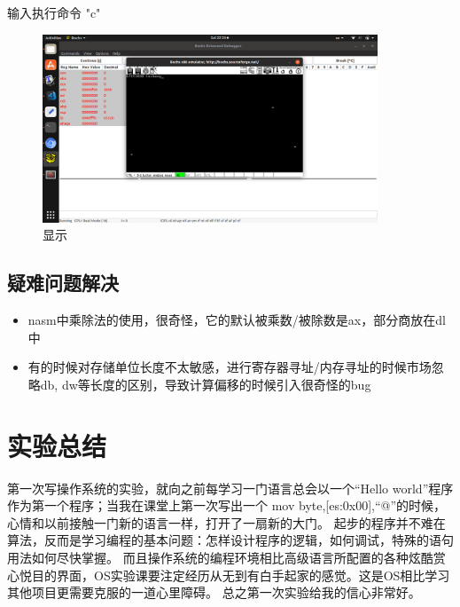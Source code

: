 \documentclass[a4paper,11pt,UTF8]{ctexart}
\newcommand{\bottomcaption}{%
\setlength{\abovecaptionskip}{6pt}%
\setlength{\belowcaptionskip}{6pt}%
\caption}
\begin{document}
	输入执行命令 "c"

	\begin{figure}[htbp]
		\centering
		\includegraphics[width=10cm]{Screenshot from 2019-03-23 22-23-44.png}
		\bottomcaption{显示}
	\end{figure}


\subsection{疑难问题解决}
	
	\begin{itemize}
		\item nasm中乘除法的使用，很奇怪，它的默认被乘数/被除数是ax，部分商放在dl中
		
		\item 有的时候对存储单位长度不太敏感，进行寄存器寻址/内存寻址的时候市场忽略db, dw等长度的区别，导致计算偏移的时候引入很奇怪的bug
			
	\end{itemize}


\section{实验总结}

第一次写操作系统的实验，就向之前每学习一门语言总会以一个“Hello world”程序作为第一个程序；当我在课堂上第一次写出一个
mov byte,[es:0x00],“@”的时候，心情和以前接触一门新的语言一样，打开了一扇新的大门。
起步的程序并不难在算法，反而是学习编程的基本问题：怎样设计程序的逻辑，如何调试，特殊的语句用法如何尽快掌握。
而且操作系统的编程环境相比高级语言所配置的各种炫酷赏心悦目的界面，OS实验课要注定经历从无到有白手起家的感觉。这是OS相比学习其他项目更需要克服的一道心里障碍。
总之第一次实验给我的信心非常好。



\clearpage
\end{document}
